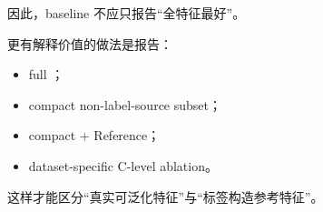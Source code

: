 因此，baseline 不应只报告“全特征最好”。

更有解释价值的做法是报告：

\begin{itemize}[leftmargin=2em]
  \item full ；
  \item compact non-label-source subset；
  \item compact + Reference；
  \item dataset-specific C-level ablation。
\end{itemize}

这样才能区分“真实可泛化特征”与“标签构造参考特征”。
